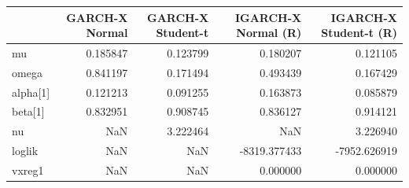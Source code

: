 \begin{table}[htbp]
\centering
\begin{tabular}{lrrrr}
\toprule
 & GARCH-X Normal & GARCH-X Student-t & IGARCH-X Normal (R) & IGARCH-X Student-t (R) \\
\midrule
mu & 0.185847 & 0.123799 & 0.180207 & 0.121105 \\
omega & 0.841197 & 0.171494 & 0.493439 & 0.167429 \\
alpha[1] & 0.121213 & 0.091255 & 0.163873 & 0.085879 \\
beta[1] & 0.832951 & 0.908745 & 0.836127 & 0.914121 \\
nu & NaN & 3.222464 & NaN & 3.226940 \\
loglik & NaN & NaN & -8319.377433 & -7952.626919 \\
vxreg1 & NaN & NaN & 0.000000 & 0.000000 \\
\bottomrule
\end{tabular}
\label{tab:sentiment_garch_igarch_params}
\end{table}
